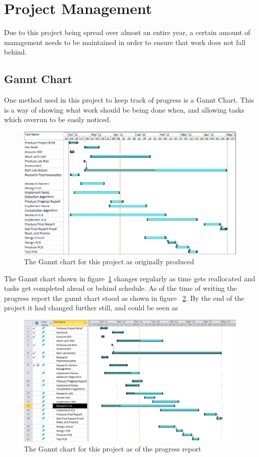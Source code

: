 \section{Project Management}
Due to this project being spread over almost an entire year, a certain amount of management needs to be maintained in order to ensure that work does not fall behind.

\subsection{Gannt Chart}
One method used in this project to keep track of progress is a Gannt Chart.
This is a way of showing what work should be being done when, and allowing tasks which overrun to be easily noticed.
\\
\begin{figure}
	\centering
	\includegraphics[width=\textwidth]{./img/ganntori.png}
	\caption{The Gannt chart for this project as originally produced}
	\label{fig:gannt}
\end{figure}

\noindent
The Gannt chart shown in figure~\ref{fig:gannt} changes regularly as time gets reallocated and tasks get completed ahead or behind schedule.
As of the time of writing the progress report the gannt chart stood as shown in figure ~\ref{fig:newgannt}.
By the end of the project it had changed further still, and could be seen as
\\
\begin{figure}
	\centering
	\includegraphics[width=\textwidth]{./img/ganntnew.png}
	\caption{The Gannt chart for this project as of the progress report}
	\label{fig:newgannt}
\end{figure}

